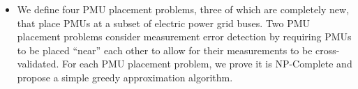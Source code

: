 \begin{itemize}



	\item We define four PMU placement problems, three of which are completely new, that place PMUs at a subset of electric power grid buses. 
		Two PMU placement problems consider measurement error detection by requiring PMUs to be placed ``near'' each other to allow for their measurements to be cross-validated. 
		For each PMU placement problem, we prove it is NP-Complete and propose a simple greedy approximation algorithm. 

	

\end{itemize}
